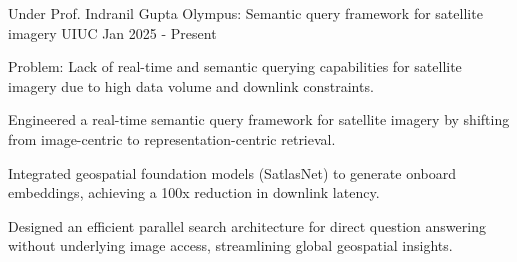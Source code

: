 \begin{cventries}


  \cventry
    {Under Prof. Indranil Gupta} %
    {Olympus: Semantic query framework for satellite imagery} %
    {UIUC} %
    {Jan 2025 - Present} %
    {
      \begin{cvitems} %
        \item Problem: Lack of real-time and semantic querying capabilities for satellite imagery due to high data volume and downlink constraints.
        \item Engineered a real-time semantic query framework for satellite imagery by shifting from image-centric to representation-centric retrieval.
        \item Integrated geospatial foundation models (SatlasNet) to generate onboard embeddings, achieving a 100x reduction in downlink latency.
        \item Designed an efficient parallel search architecture for direct question answering without underlying image access, streamlining global geospatial insights.
      \end{cvitems}
    }






\end{cventries}
